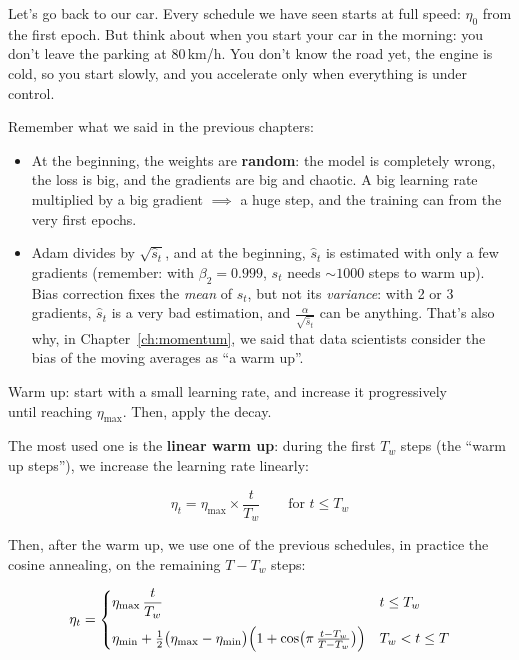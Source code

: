 Let's go back to our car. Every schedule we have seen starts at full speed: $\eta_0$ from the first epoch. But think about when you start your car in the morning: you don't leave the parking at 80\,km/h. You don't know the road yet, the engine is cold, so you start slowly, and you accelerate only when everything is under control.


Remember what we said in the previous chapters:
\begin{itemize}
  \item At the beginning, the weights are \textbf{random}: the model is completely wrong, the loss is big, and the gradients are big and chaotic. A big learning rate multiplied by a big gradient $\implies$ a huge step, and the training can  from the very first epochs.
  \item Adam divides by $\sqrt{\hat s_t}$, and at the beginning, $\hat s_t$ is estimated with only a few gradients (remember: with $\beta_2=0.999$, $s_t$ needs $\sim1000$ steps to warm up). Bias correction fixes the \emph{mean} of $s_t$, but not its \emph{variance}: with 2 or 3 gradients, $\hat s_t$ is a very bad estimation, and $\frac{\alpha}{\sqrt{\hat s_t}}$ can be anything. That's also why, in Chapter~\ref{ch:momentum}, we said that data scientists consider the bias of the moving averages as ``a warm up''.
\end{itemize}

\begin{goldbox}
Warm up: start with a small learning rate, and increase it progressively\\ until reaching $\eta_{\max}$. Then, apply the decay.
\end{goldbox}

The most used one is the \textbf{linear warm up}: during the first $T_w$ steps (the ``warm up steps''), we increase the learning rate linearly:
\begin{keyformula}
\[
\eta_t=\eta_{\max}\times\frac{t}{T_w}\qquad\text{for }t\le T_w
\]
\end{keyformula}
Then, after the warm up, we use one of the previous schedules, in practice the cosine annealing, on the remaining $T-T_w$ steps:
\begin{keyformula}
\[
\eta_t=\begin{cases}
\eta_{\max}\,\dfrac{t}{T_w} & t\le T_w\\[10pt]
\eta_{\min}+\tfrac12\bigl(\eta_{\max}-\eta_{\min}\bigr)\Bigl(1+\cos\bigl(\pi\,\tfrac{t-T_w}{T-T_w}\bigr)\Bigr) & T_w<t\le T
\end{cases}
\]
\end{keyformula}

